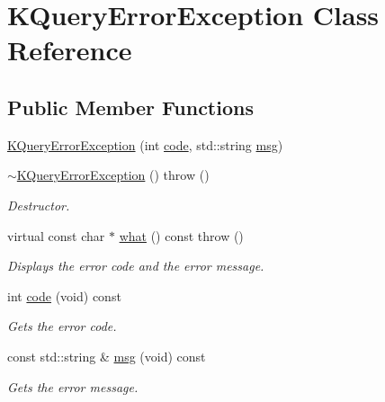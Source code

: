\hypertarget{class_k_query_error_exception}{\section{\-K\-Query\-Error\-Exception \-Class \-Reference}
\label{class_k_query_error_exception}
}
\subsection*{\-Public \-Member \-Functions}
\begin{DoxyCompactItemize}
\item 
\hyperlink{class_k_query_error_exception_aa077738c9ed48ccbf1b6195a7e84af13}{\-K\-Query\-Error\-Exception} (int \hyperlink{class_k_query_error_exception_a2b988637b4b52b58487ea51ffea3383d}{code}, std\-::string \hyperlink{class_k_query_error_exception_a0dcf663135ac997d6eaa9f6afb07bb57}{msg})
\item 
\hypertarget{class_k_query_error_exception_a7e1f0181916ef0b44a86eba8ee0b0a87}{\hyperlink{class_k_query_error_exception_a7e1f0181916ef0b44a86eba8ee0b0a87}{$\sim$\-K\-Query\-Error\-Exception} ()  throw ()}\label{class_k_query_error_exception_a7e1f0181916ef0b44a86eba8ee0b0a87}

\begin{DoxyCompactList}\small\item\em \-Destructor. \end{DoxyCompactList}\item 
\hypertarget{class_k_query_error_exception_acf0ce601c16c2e0cef7bb99548e17fa9}{virtual const char $\ast$ \hyperlink{class_k_query_error_exception_acf0ce601c16c2e0cef7bb99548e17fa9}{what} () const   throw ()}\label{class_k_query_error_exception_acf0ce601c16c2e0cef7bb99548e17fa9}

\begin{DoxyCompactList}\small\item\em \-Displays the error code and the error message. \end{DoxyCompactList}\item 
int \hyperlink{class_k_query_error_exception_a2b988637b4b52b58487ea51ffea3383d}{code} (void) const 
\begin{DoxyCompactList}\small\item\em \-Gets the error code. \end{DoxyCompactList}\item 
const std\-::string \& \hyperlink{class_k_query_error_exception_a0dcf663135ac997d6eaa9f6afb07bb57}{msg} (void) const 
\begin{DoxyCompactList}\small\item\em \-Gets the error message. \end{DoxyCompactList}\end{DoxyCompactItemize}


